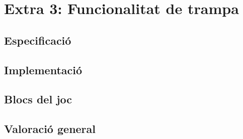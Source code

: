 \chapter{Extra 3: Funcionalitat de trampa}

\section{Especificació}


\section{Implementació}


\section{Blocs del joc}

\section{Valoració general}

